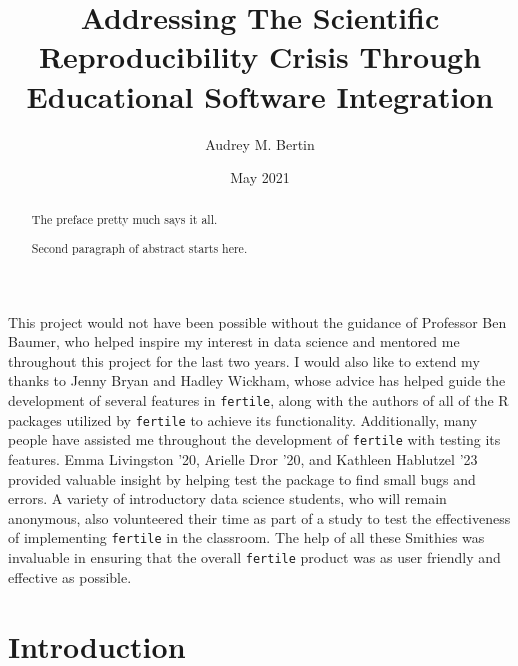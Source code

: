 \documentclass[12pt,twoside]{reedthesis}
\title{Addressing The Scientific Reproducibility Crisis Through Educational Software Integration}
\author{Audrey M. Bertin}
\date{May 2021}
\begin{document}
  \maketitle

\frontmatter %
\pagestyle{empty} %
  \begin{acknowledgements}
    This project would not have been possible without the guidance of Professor Ben Baumer, who helped inspire my interest in data science and mentored me throughout this project for the last two years.
    I would also like to extend my thanks to Jenny Bryan and Hadley Wickham, whose advice has helped guide the development of several features in \texttt{fertile}, along with the authors of all of the R packages utilized by \texttt{fertile} to achieve its functionality.
    Additionally, many people have assisted me throughout the development of \texttt{fertile} with testing its features. Emma Livingston '20, Arielle Dror '20, and Kathleen Hablutzel '23 provided valuable insight by helping test the package to find small bugs and errors. A variety of introductory data science students, who will remain anonymous, also volunteered their time as part of a study to test the effectiveness of implementing \texttt{fertile} in the classroom. The help of all these Smithies was invaluable in ensuring that the overall \texttt{fertile} product was as user friendly and effective as possible.
  \end{acknowledgements}

  \hypersetup{linkcolor=black}
  \setcounter{tocdepth}{2}
  \tableofcontents


  \listoffigures
  \begin{abstract}
    The preface pretty much says it all.
    
    \par
    
    Second paragraph of abstract starts here.
  \end{abstract}

\mainmatter %
\pagestyle{fancyplain} %

\hypertarget{introduction}{%
\chapter*{Introduction}\label{introduction}}
\end{document}
